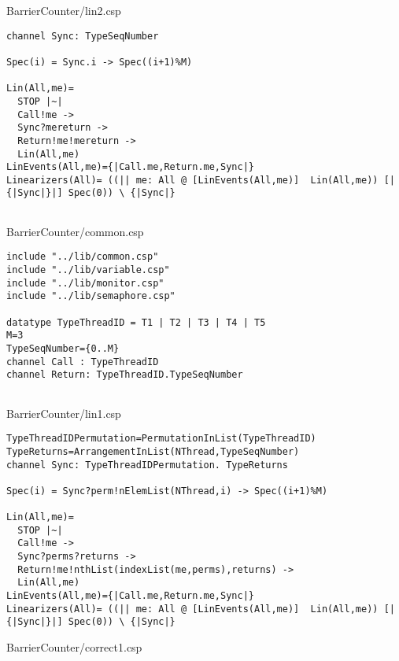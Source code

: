 BarrierCounter/lin2.csp
\begin{lstlisting}
channel Sync: TypeSeqNumber

Spec(i) = Sync.i -> Spec((i+1)%M)

Lin(All,me)=
  STOP |~|
  Call!me ->
  Sync?mereturn ->
  Return!me!mereturn ->
  Lin(All,me)
LinEvents(All,me)={|Call.me,Return.me,Sync|}
Linearizers(All)= ((|| me: All @ [LinEvents(All,me)]  Lin(All,me)) [|{|Sync|}|] Spec(0)) \ {|Sync|}


\end{lstlisting}
BarrierCounter/common.csp
\begin{lstlisting}
include "../lib/common.csp"
include "../lib/variable.csp"
include "../lib/monitor.csp"
include "../lib/semaphore.csp"

datatype TypeThreadID = T1 | T2 | T3 | T4 | T5
M=3
TypeSeqNumber={0..M}
channel Call : TypeThreadID
channel Return: TypeThreadID.TypeSeqNumber


\end{lstlisting}
BarrierCounter/lin1.csp
\begin{lstlisting}
TypeThreadIDPermutation=PermutationInList(TypeThreadID)
TypeReturns=ArrangementInList(NThread,TypeSeqNumber)
channel Sync: TypeThreadIDPermutation. TypeReturns

Spec(i) = Sync?perm!nElemList(NThread,i) -> Spec((i+1)%M)

Lin(All,me)=
  STOP |~|
  Call!me ->
  Sync?perms?returns ->
  Return!me!nthList(indexList(me,perms),returns) ->
  Lin(All,me)
LinEvents(All,me)={|Call.me,Return.me,Sync|}
Linearizers(All)= ((|| me: All @ [LinEvents(All,me)]  Lin(All,me)) [|{|Sync|}|] Spec(0)) \ {|Sync|}

\end{lstlisting}
BarrierCounter/correct1.csp
